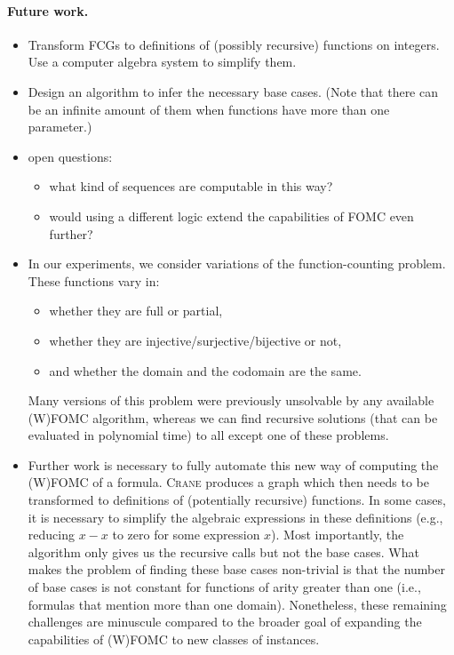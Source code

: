 \paragraph*{Future work.}
\begin{itemize}
  \item Transform FCGs to definitions of (possibly recursive) functions on
        integers. Use a computer algebra system to simplify them.
  \item Design an algorithm to infer the necessary base cases. (Note that there
        can be an infinite amount of them when functions have more than one
        parameter.)
  \item open questions:
  \begin{itemize}
    \item what kind of sequences are computable in this way?
    \item would using a different logic extend the capabilities
    of FOMC even further?
  \end{itemize}
  \item In our experiments, we consider variations of the function-counting
        problem. These functions vary in:
        \begin{itemize}
          \item whether they are full or partial,
          \item whether they are injective/surjective/bijective or not,
          \item and whether the domain and the codomain are the same.
        \end{itemize}
        Many versions of this problem were previously unsolvable by any
        available (W)FOMC algorithm, whereas we can find recursive solutions
        (that can be evaluated in polynomial time) to all except one of these
        problems.
  \item Further work is necessary to fully automate this new way of computing
        the (W)FOMC of a formula. \textsc{Crane} produces a graph which then
        needs to be transformed to definitions of (potentially recursive)
        functions. In some cases, it is necessary to simplify the algebraic
        expressions in these definitions (e.g., reducing $x-x$ to zero for some
        expression $x$). Most importantly, the algorithm only gives us the
        recursive calls but not the base cases. What makes the problem of
        finding these base cases non-trivial is that the number of base cases is
        not constant for functions of arity greater than one (i.e., formulas
        that mention more than one domain). Nonetheless, these remaining
        challenges are minuscule compared to the broader goal of expanding the
        capabilities of (W)FOMC to new classes of instances.
\end{itemize}
